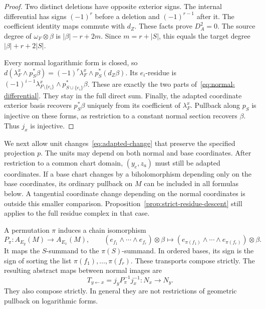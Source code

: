 \begin{proof}
Two distinct deletions have opposite exterior signs.
The internal differential has signs $(-1)^r$ before a deletion and $(-1)^{r-1}$ after it.
The coefficient identity maps commute with $d_Z$.
These facts prove $D_A^2=0$.
The source degree of $\omega_F\otimes\beta$ is $|\beta|-r+2m$.
Since $m=r+|S|$, this equals the target degree $|\beta|+r+2|S|$.

Every normal logarithmic form is closed, so
$d(\lambda_F^x\wedge p_S^*\beta)=(-1)^r\lambda_F^x\wedge p_S^*(d_Z\beta)$.
Its $e_i$-residue is
$(-1)^{i-1}\lambda_{F\setminus\{e_i\}}^x\wedge p_{S\cup\{e_i\}}^*\beta$.
These are exactly the two parts of~\eqref{eq:normal-differential}.
They stay in the full direct sum.
Finally, the adapted coordinate exterior basis recovers $p_S^*\beta$ uniquely from its coefficient of $\lambda_F^x$.
Pullback along $p_S$ is injective on these forms, as restriction to a constant normal section recovers $\beta$.
Thus $j_x$ is injective.
\end{proof}

We next allow unit changes~\eqref{eq:adapted-change} that preserve the specified projection $p$.
The units may depend on both normal and base coordinates.
After restriction to a common chart domain, $(y_e,z_a)$ must still be adapted coordinates.
If a base chart changes by a biholomorphism depending only on the base coordinates,
its ordinary pullback on $M$ can be included in all formulas below.
A tangential coordinate change depending on the normal coordinates is outside this smaller comparison.
Proposition~\ref{prop:strict-residue-descent} still applies to the full residue complex in that case.

\begin{proposition}
\label{prop:normal-transport}
A permutation $\pi$ induces a chain isomorphism
\[
P_\pi:A_{E_y}(M)\longrightarrow A_{E_x}(M),\qquad
(e_{f_1}\wedge\cdots\wedge e_{f_r})\otimes\beta
\longmapsto(e_{\pi(f_1)}\wedge\cdots\wedge e_{\pi(f_r)})\otimes\beta.
\]
It maps the $S$-summand to the $\pi(S)$-summand.
In ordered bases, its sign is the sign of sorting the list $\pi(f_1),\ldots,\pi(f_r)$.
These transports compose strictly.
The resulting abstract maps between normal images are
\[
T_{y\leftarrow x}=j_yP_\pi^{-1}j_x^{-1}:N_x\longrightarrow N_y.
\]
They also compose strictly.
In general they are not restrictions of geometric pullback on logarithmic forms.
\end{proposition}

